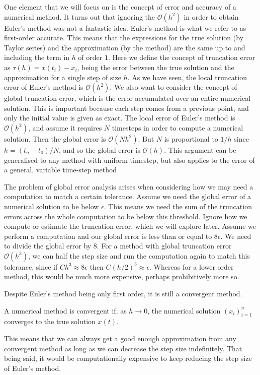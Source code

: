 One element that we will focus on is the concept of error and accuracy of a numerical method.
It turns out that ignoring the $\mathcal{O}(h^2)$ in order to obtain Euler's method was not a fantastic idea.
Euler's method is what we refer to as first-order accurate.
This means that the expressions for the true solution (by Taylor series) and the approximation (by the method) are the same up to and including the term in $h$ of order $1$.
Here we define the concept of truncation error as $\tau(h) = x(t_i) - x_i$, being the error between the true solution and the approximation for a single step of size $h$.
As we have seen, the local truncation error of Euler's method is $\mathcal{O}(h^2)$.
We also want to consider the concept of global truncation error, which is the error accumulated over an entire numerical solution.
This is important because each step comes from a previous point, and only the initial value is given as exact. %
The local error of Euler's method is $\mathcal{O}(h^2)$, and assume it requires $N$ timesteps in order to compute a numerical solution.
Then the global error is $\mathcal{O}(Nh^2)$. But $N$ is proportional to $1/h$ since $h = (t_n - t_0)/N$, and so the global error is $\mathcal{O}(h)$.
This argument can be generalised to any method with uniform timestep, but also applies to the error of a general, variable time-step method \cite{hairerwanner1993}

The problem of global error analysis arises when considering how we may need a computation to match a certain tolerance.
Assume we need the global error of a numerical solution to be below $\epsilon$.
This means we need the sum of the truncation errors across the whole computation to be below this threshold.
Ignore how we compute or estimate the truncation error, which we will explore later.
Assume we perform a computation and our global error is less than or equal to $8 \epsilon$.
We need to divide the global error by $8$. For a method with global truncation error $\mathcal{O}(h^3)$,
we can half the step size and run the computation again to match this tolerance, since if $C h^3 \approx 8 \epsilon$ then $C (h/2)^3 \approx \epsilon$.
Whereas for a lower order method, this would be much more expensive, perhaps prohibitively more so.

Despite Euler's method being only first order, it is still a convergent method.
\begin{definition}
    A numerical method is convergent if, as $h \rightarrow 0$, the numerical solution $(x_i)_{i=1}^{n}$ converges to the true solution $x(t)$. 
\end{definition}
This means that we can always get a good enough approximation from any convergent method as long as we can decrease the step size indefinitely.
That being said, it would be computationally expensive to keep reducing the step size of Euler's method.

